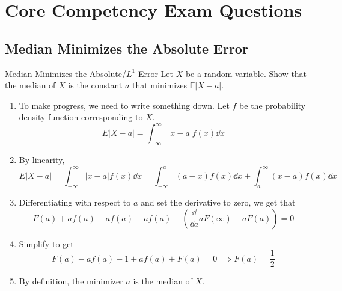 \documentclass[../main]{subfiles}
\begin{document}
\section{Core Competency Exam Questions}
\subsection{Median Minimizes the Absolute Error}
\begin{bbox}{Median Minimizes the Absolute/$L^1$ Error}
    Let $X$ be a random variable. Show that the median of $X$ is the constant $a$ that minimizes $\mathbb E |X-a|$.
\end{bbox}
\begin{solution}
    \begin{enumerate}
        \item To make progress, we need to write something down. Let $f$ be the probability density function corresponding to $X$.
        \[
        E |X-a| = \int_{-\infty}^\infty |x-a| f(x)\dd x
        \]
        \item By linearity,
        \[
        E |X-a| = \int_{-\infty}^\infty |x-a| f(x)\dd x = \int_{-\infty}^a (a-x) f(x)  \dd x + \int_{a}^\infty (x-a) f(x) \dd x
        \]
        \item Differentiating with respect to $a$ and set the derivative to zero, we get that
        \[
        F(a) + af(a) - af(a) - af(a) - (\frac{\dd}{\dd a} aF(\infty) - aF(a)) = 0
        \]
        \item Simplify to get 
        \[
        F(a) - a f(a) - 1 + af(a) + F(a) = 0 \implies F(a) = \frac{1}{2}
        \]
        \item By definition, the minimizer $a$ is the median of $X$.
    \end{enumerate}
\end{solution}
\end{document}
